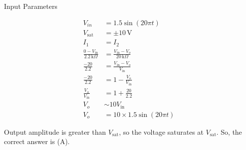 \documentclass[journal,12pt,twocolumn]{IEEEtran}
\begin{document}
\begin{table}
  \centering
  
  
  \caption{Input Parameters}
  \label{tab:PH.11.table1}
\end{table}
\begin{align}
V_{in} &= 1.5 \sin(20\pi t)\\
V_{\text{sat}} &= \pm 10 \, \text{V}\\
I_1 &= I_2\\
\frac{0 - V_{\text{in}}}{2.2 \, \text{k}\Omega} &= \frac{V_{\text{in}} - V_o}{20 \, \text{k}\Omega}\\
\frac{-20}{2.2} &= \frac{V_{\text{in}} - V_o}{V_{\text{in}}}\\
\frac{-20}{2.2} &= 1 - \frac{V_o}{V_{\text{in}}}\\
\frac{V_o}{V_{\text{in}}} &= 1 + \frac{20}{2.2}\\
V_o &\sim 10 V_{\text{in}}\\
V_o &= 10 \times 1.5 \sin(20\pi t)
\end{align}

Output amplitude is greater than $V_{\text{sat}}$, so the voltage saturates at $V_{\text{sat}}$.
So, the correct answer is (A).
\end{document}
